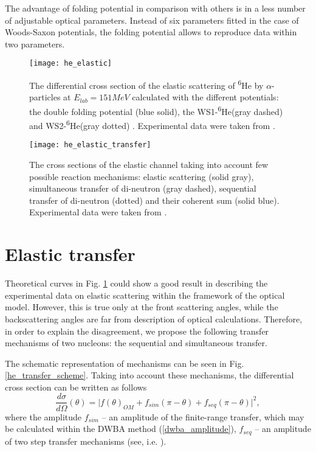\documentclass[
12pt, %
oneside, %
english, %
doublespacing, %
doublespacing, %
toctotoc, %
parskip, %
headsepline, %
]{MastersDoctoralThesis} %
\newcommand{\he}{\textsuperscript{6}He\xspace}
\begin{document}
The advantage of folding potential in comparison with others is in a less number of adjustable optical parameters. Instead of six parameters fitted in the case of Woods-Saxon potentials, the folding potential allows to reproduce data within two parameters.

\begin{figure}
\centering
\texttt{[image: he\_elastic]}
\decoRule
\caption{    The differential cross section of the elastic scattering of \he by $\alpha$-particles at $E_{lab}=151MeV$ calculated with the different potentials: the double folding potential (blue solid), the WS1-\he  (gray dashed) \cite{oganessian1999dynamics} and  WS2-\he (gray dotted) \cite{oganessian1999dynamics}. Experimental data were taken from \cite{oganessian1999dynamics}.
}
\label{he_elastic}
\end{figure}
\begin{figure}[tp]
\centering
\texttt{[image: he\_elastic\_transfer]} 
\decoRule
\caption{    The cross sections of the elastic channel taking into account few possible reaction mechanisms: elastic scattering (solid gray), simultaneous transfer of di-neutron (gray dashed), sequential transfer of di-neutron (dotted) and their coherent sum (solid blue). Experimental data were taken from \cite{oganessian1999dynamics}.
}
\label{he_elastic_transfer}
\end{figure}


\section{Elastic transfer}
Theoretical curves in Fig. \ref{he_elastic} could  show a good result in describing the experimental data on elastic scattering within the framework of the optical model. However, this is true only at the front scattering angles, while the backscattering angles are far from description of optical calculations. Therefore, in order to explain the disagreement, we propose the following transfer mechanisms of two nucleons: the sequential and simultaneous transfer.

The schematic representation of mechanisms can be seen in Fig. \ref{he_transfer_scheme}. Taking into account these mechanisms, the differential cross section can be written as follows
\begin{equation}
\dfrac{d\sigma}{d\Omega}(\theta) =
 \vert f(\theta)_{OM} + f_{sim}(\pi - \theta)+ f_{seq}(\pi - \theta)  \vert^2,
\label{eq:he_cs}
\end{equation}
where the amplitude $f_{sim}$ -- an amplitude of the finite-range transfer, which may be calculated within the DWBA method (\ref{dwba_amplitude}), $f_{seq}$ -- an amplitude of two step transfer mechanisms (see, i.e. \cite{satchler1983, fresco}).
\end{document}
